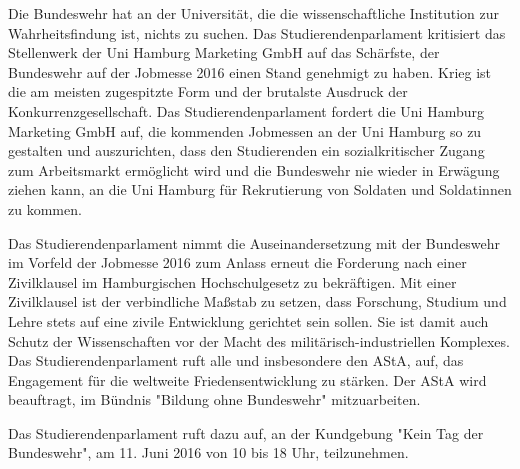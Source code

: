 \documentclass[ngerman,headheight=70pt]{scrartcl}
\begin{document}
    Die Bundeswehr hat an der Universität, die die wissenschaftliche Institution
    zur Wahrheitsfindung ist, nichts zu suchen. Das Studierendenparlament
    kritisiert das Stellenwerk der Uni Hamburg Marketing GmbH auf das Schärfste,
    der Bundeswehr auf der Jobmesse 2016 einen Stand genehmigt zu haben.
    Krieg ist die am meisten zugespitzte Form und der brutalste Ausdruck der
    Konkurrenzgesellschaft. Das Studierendenparlament fordert die Uni Hamburg
    Marketing GmbH auf, die kommenden Jobmessen an der Uni Hamburg so zu
    gestalten und auszurichten, dass den Studierenden ein sozialkritischer Zugang
    zum Arbeitsmarkt ermöglicht wird und die Bundeswehr nie wieder in Erwägung
    ziehen kann, an die Uni Hamburg für Rekrutierung von Soldaten und Soldatinnen
    zu kommen.

    Das Studierendenparlament nimmt die Auseinandersetzung mit der Bundeswehr im
    Vorfeld der Jobmesse 2016 zum Anlass erneut die Forderung nach einer
    Zivilklausel im Hamburgischen Hochschulgesetz zu bekräftigen. Mit einer
    Zivilklausel ist der verbindliche Maßstab zu setzen, dass Forschung, Studium
    und Lehre stets auf eine zivile Entwicklung gerichtet sein sollen. Sie ist
    damit auch Schutz der Wissenschaften vor der Macht des
    militärisch-industriellen Komplexes. Das Studierendenparlament ruft alle und
    insbesondere den AStA, auf, das Engagement für die weltweite
    Friedensentwicklung zu stärken. Der AStA wird beauftragt, im Bündnis
    "Bildung ohne Bundeswehr" mitzuarbeiten.

    Das Studierendenparlament ruft dazu auf, an der Kundgebung "Kein Tag der Bundeswehr",
    am 11. Juni 2016 von 10 bis 18 Uhr, teilzunehmen.
\end{document}
